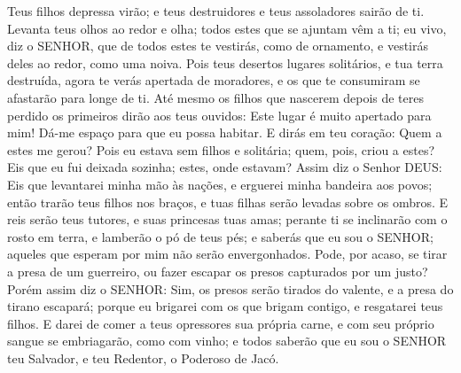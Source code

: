 {Teus filhos depressa virão; e teus destruidores e teus assoladores sairão de ti.
Levanta teus olhos ao redor e olha; todos estes que se ajuntam vêm a ti;
{} eu vivo, diz o SENHOR, que de todos estes te vestirás, como de ornamento, e vestirás deles ao
{} redor, como uma noiva.
Pois
{} teus desertos
{} lugares solitários, e tua terra
{} destruída, agora te verás apertada de moradores, e os que te consumiram se afastarão para longe de ti.
Até mesmo os filhos que nascerem depois de teres perdido os primeiros
 dirão aos teus ouvidos: Este lugar é muito apertado para mim! Dá-me espaço para que eu possa habitar.
E dirás em teu coração: Quem a estes me gerou? Pois eu estava sem filhos e solitária; quem, pois,
{} criou a estes? Eis que eu fui deixada sozinha;
{} estes, onde estavam?
Assim diz o Senhor DEUS: Eis que levantarei minha mão às nações, e erguerei minha bandeira aos povos; então trarão teus filhos nos braços, e tuas filhas serão levadas sobre os ombros.
E reis serão teus tutores, e suas princesas
 tuas amas; perante ti se inclinarão com o rosto em terra, e lamberão o pó de teus pés; e saberás que eu sou o SENHOR; aqueles que esperam por mim não serão envergonhados.
Pode, por acaso, se tirar a presa de um guerreiro, ou fazer escapar os presos capturados por um justo?
Porém assim diz o SENHOR: Sim, os presos serão tirados do valente, e a presa do tirano escapará; porque eu brigarei com os que brigam contigo, e resgatarei teus filhos.
E darei de comer a teus opressores sua própria carne, e com seu próprio sangue se embriagarão, como com vinho; e todos saberão que eu sou o SENHOR teu Salvador, e teu Redentor, o Poderoso de Jacó.

}
